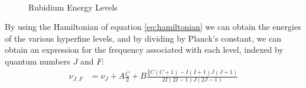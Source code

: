 \documentclass[12pt]{article}
\begin{document}
\begin{figure}%
	\centering
	\,
	\caption{Rubidium Energy Levels}%
	\label{fig:RbEnergy}%
\end{figure}

By using the Hamiltonian of equation \ref{eq:hamiltonian} we can obtain the energies of the various hyperfine levels, and by dividing by Planck's constant, we can obtain an expression for the frequency associated with each level, indexed by quantum numbers $J$ and $F$:
\begin{align*}
	\nu_{J,F} &= \nu_J + A\frac{C}{2} + B \frac{\frac{3}{4}C(C+1) - I(I+1)J(J+1)}{2I(2I-1)J(2J-1)}
\end{align*}
\end{document}
